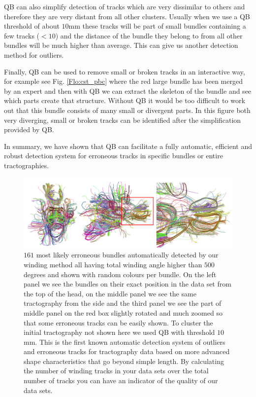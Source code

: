\documentclass[preprint,authoryear,a4paper,10pt,onecolumn]{elsarticle}
\begin{document}
QB can also simplify detection of tracks which are very dissimilar to
others and therefore they are very distant from all other clusters.
Usually when we use a QB threshold of about $10$mm these tracks will be
part of small bundles containing a few tracks ($<10$) and the distance
of the bundle they belong to from all other bundles will be much higher
than average. This can give us another detection method for outliers.

Finally, QB can be used to remove small or broken tracks in an
interactive way, for example see Fig. \ref{Flo:cst_pbc} where the red
large bundle has been merged by an expert and then with QB we can
extract the skeleton of the bundle and see which parts create that
structure. Without QB it would be too difficult to work out that this
bundle consists of many small or divergent parts. In this figure both
very diverging, small or broken tracks can be identified after the
simplification provided by QB.

In summary, we have shown that QB can facilitate a fully automatic,
efficient and robust detection system for erroneous tracks in specific
bundles or entire tractographies.

%
\begin{figure}
\begin{centering}
\includegraphics[scale=0.65]{last_figures/erroneous_tracks}
\par\end{centering}

\label{Flo:erroneous_tracks}
\caption{$161$ most likely erroneous bundles automatically detected by
  our winding method all having total winding angle higher than $500$
  degrees and shown with random colours per bundle. On the left panel we
  see the bundles on their exact position in the data set from the top
  of the head, on the middle panel we see the same tractography from the
  side and the third panel we see the part of middle panel on the red
  box slightly rotated and much zoomed so that some erroneous tracks can
  be easily shown. To cluster the initial tractography not shown here we
  used QB with threshold $10$mm. This is the first known automatic
  detection system of outliers and erroneous tracks for tractography
  data based on more advanced shape characteristics that go beyond
  simple length. By calculating the number of winding tracks in your
  data sets over the total number of tracks you can have an indicator of
  the quality of our data sets.}

\end{figure}
\end{document}
